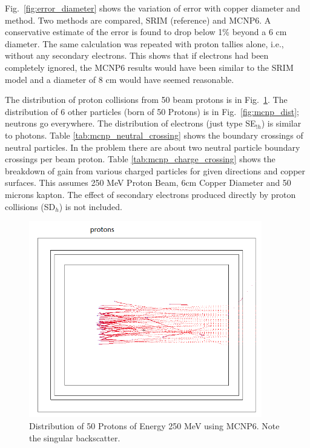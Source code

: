 \documentclass{mc2015}
\begin{document}
Fig.~\ref{fig:error_diameter} shows the variation of error with copper diameter and method. Two methods are compared, SRIM (reference) and MCNP6. A conservative estimate of the error is found to drop below 1\% beyond a 6 cm diameter.  The same calculation was repeated with proton tallies alone, i.e., without any secondary electrons. This shows that if electrons had been completely ignored, the MCNP6 results would have been similar to the SRIM model and a diameter of 8 cm would have seemed reasonable.

The distribution of proton collisions from 50 beam protons is in Fig.~\ref{fig:mcnp_tracks}. The distribution of 6 other particles (born of 50 Protons) is in Fig.~\ref{fig:mcnp_dist}; neutrons go everywhere. The distribution of electrons (just type SE$_{!h}$) is similar to photons. Table \ref{tab:mcnp_neutral_crossing} shows the boundary crossings of neutral particles. In the problem there are about two neutral particle boundary crossings per beam proton. Table \ref{tab:mcnp_charge_crossing} shows the breakdown of gain from various charged particles for given directions and copper surfaces. This assumes 250 MeV Proton Beam, 6cm Copper Diameter and 50 microns kapton. The effect of secondary electrons produced directly by proton collisions (SD$_h$) is not included.

\begin{figure}[H]
  \centering
  \includegraphics[width=4in]{figures/fig_mcnp_tracks.png}
  \caption{Distribution of 50 Protons of Energy 250 MeV using MCNP6. Note the singular backscatter.}
  \label{fig:mcnp_tracks}
\end{figure}
\end{document}

